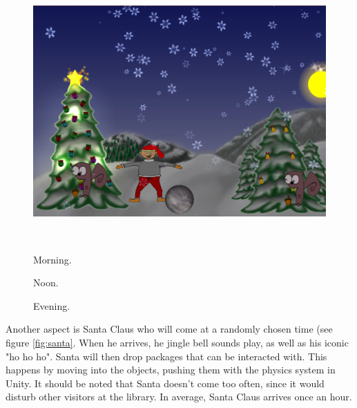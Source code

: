 \begin{figure}[htbp]
\begin{minipage}[b]{0.3\textwidth}
		\includegraphics[width=1.00\textwidth]{Pictures/Design/time3.png} %
	\end{minipage}\\ %
	\begin{minipage}[t]{0.3\textwidth}
		\caption{Morning.} %
		\label{fig:time1}
	\end{minipage}\hfill
	\begin{minipage}[t]{0.3\textwidth}
		\caption{Noon.} %
		\label{fig:time2}
	\end{minipage}\hfill	
	\begin{minipage}[t]{0.3\textwidth}
		\caption{Evening.} %
		\label{fig:time3}
	\end{minipage}
\end{figure}

Another aspect is Santa Claus who will come at a randomly chosen time (see figure \ref{fig:santa}. When he arrives, he jingle bell sounds play, as well as his iconic "ho ho ho". Santa will then drop packages that can be interacted with. This happens by moving into the objects, pushing them with the physics system in Unity. It should be noted that Santa doesn't come too often, since it would disturb other visitors at the library. In average, Santa Claus arrives once an hour.

